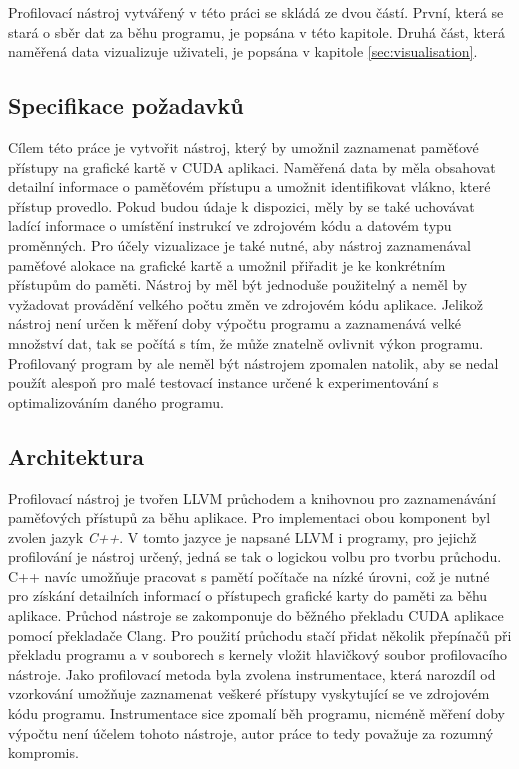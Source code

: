 Profilovací nástroj vytvářený v této práci se skládá ze dvou částí. První, která se stará o sběr dat za běhu programu, je popsána v této kapitole. Druhá část, která naměřená data vizualizuje uživateli, je popsána v kapitole \ref{sec:visualisation}.

\subsection{Specifikace požadavků}
Cílem této práce je vytvořit nástroj, který by umožnil zaznamenat paměťové přístupy na grafické kartě v CUDA aplikaci. Naměřená data by měla obsahovat detailní informace o paměťovém přístupu a umožnit identifikovat vlákno, které přístup provedlo. Pokud budou údaje k dispozici, měly by se také uchovávat ladící informace o umístění instrukcí ve zdrojovém kódu a datovém typu proměnných.
Pro účely vizualizace je také nutné, aby nástroj zaznamenával paměťové alokace na grafické kartě a umožnil přiřadit je ke konkrétním přístupům do paměti.
Nástroj by měl být jednoduše použitelný a neměl by vyžadovat provádění velkého počtu změn ve zdrojovém kódu aplikace. Jelikož nástroj není určen k měření doby výpočtu programu a zaznamenává velké množství dat, tak se počítá s tím, že může znatelně ovlivnit výkon programu. Profilovaný program by ale neměl být nástrojem zpomalen natolik, aby se nedal použít alespoň pro malé testovací instance určené k experimentování s optimalizováním daného programu.

\subsection{Architektura}
Profilovací nástroj je tvořen LLVM průchodem a knihovnou pro zaznamenávání paměťových přístupů za běhu aplikace. Pro implementaci obou komponent byl zvolen jazyk \emph{C++}. V tomto jazyce je napsané LLVM i programy, pro jejichž profilování je nástroj určený, jedná se tak o logickou volbu pro tvorbu průchodu. C++ navíc umožňuje pracovat s pamětí počítače na nízké úrovni, což je nutné pro získání detailních informací o přístupech grafické karty do paměti za běhu aplikace.
Průchod nástroje se zakomponuje do běžného překladu CUDA aplikace pomocí překladače Clang. Pro použití průchodu stačí přidat několik přepínačů při překladu programu a v souborech s kernely vložit hlavičkový soubor profilovacího nástroje. 
Jako profilovací metoda byla zvolena instrumentace, která narozdíl od vzorkování umožňuje zaznamenat veškeré přístupy vyskytující se ve zdrojovém kódu programu. Instrumentace sice zpomalí běh programu, nicméně měření doby výpočtu není účelem tohoto nástroje, autor práce to tedy považuje za rozumný kompromis.

